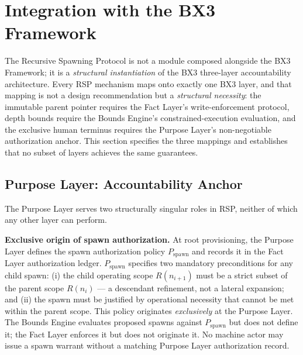 \section{Integration with the BX3 Framework}
\label{sec:rs-integration}

The Recursive Spawning Protocol is not a module composed alongside the BX3 Framework; it is a \textit{structural instantiation} of the BX3 three-layer accountability architecture. Every RSP mechanism maps onto exactly one BX3 layer, and that mapping is not a design recommendation but a \textit{structural necessity}: the immutable parent pointer requires the Fact Layer's write-enforcement protocol, depth bounds require the Bounds Engine's constrained-execution evaluation, and the exclusive human terminus requires the Purpose Layer's non-negotiable authorization anchor. This section specifies the three mappings and establishes that no subset of layers achieves the same guarantees.

\subsection{Purpose Layer: Accountability Anchor}
\label{sec:rs-purpose-anchor}

The Purpose Layer serves two structurally singular roles in RSP, neither of which any other layer can perform.

\medskip
\noindent\textbf{Exclusive origin of spawn authorization.} At root provisioning, the Purpose Layer defines the spawn authorization policy $P_{\mathrm{spawn}}$ and records it in the Fact Layer authorization ledger. $P_{\mathrm{spawn}}$ specifies two mandatory preconditions for any child spawn: (i) the child operating scope $R(n_{i+1})$ must be a strict subset of the parent scope $R(n_i)$ --- a descendant refinement, not a lateral expansion; and (ii) the spawn must be justified by operational necessity that cannot be met within the parent scope. This policy originates \textit{exclusively} at the Purpose Layer. The Bounds Engine evaluates proposed spawns against $P_{\mathrm{spawn}}$ but does not define it; the Fact Layer enforces it but does not originate it. No machine actor may issue a spawn warrant without a matching Purpose Layer authorization record.


